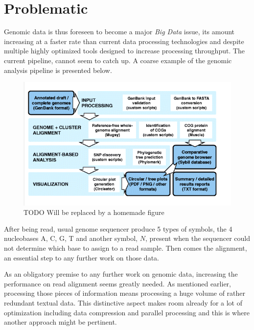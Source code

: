 \section{Problematic}

Genomic data is thus foreseen to become a major \textit{Big Data} issue, its amount increasing at a faster rate than current data processing technologies and despite multiple highly optimized tools designed to increase processing throughput. The current pipeline, cannot seem to catch up. A coarse example of the genomic analysis pipeline is presented below. \\

\begin{minipage}[t]{0.60\textwidth}
\begin{figure}[H]
    \centering
    \includegraphics[scale = 0.4]{Figures/pipeline.png}
    \caption{TODO Will be replaced by a homemade figure}
    \label{fig:analysispipe}
\end{figure}
\end{minipage}
\begin{minipage}[t]{0.350\textwidth}
After being read, usual genome sequencer produce 5 types of symbols, the 4 nucleobases A, C, G, T and another symbol, $N$, present when the sequencer could not determine which base to assign to a read sample. Then comes the alignment, an essential step to any further work on those data. \\

\end{minipage}
\vspace*{5mm}



As an obligatory premise to any further work on genomic data, increasing the performance on read alignment seems greatly needed. As mentioned earlier, processing those pieces of information means processing a huge volume of rather redundant textual data. This distinctive aspect makes room already for a lot of optimization including data compression and parallel processing and this is where another approach might be pertinent. \\

